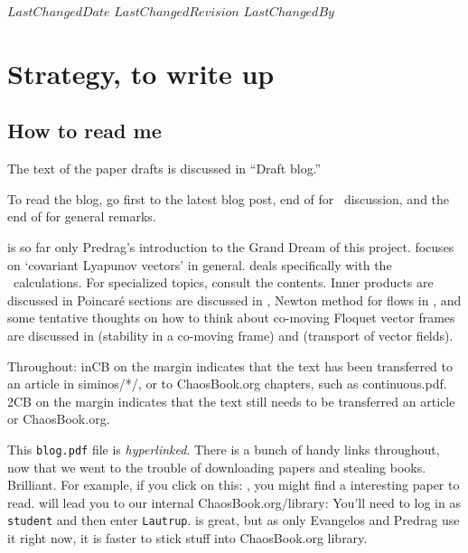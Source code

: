 \ifsvnmulti
 {$LastChangedDate$}
 {$LastChangedRevision$} {$LastChangedBy$}
\fi

\chapter{Strategy, to write up}

\section{How to read me}

The text of the paper drafts is discussed in 
``Draft blog.''

To read the blog, go first to the latest blog post, end
of  for \KS\ discussion, and the end
of  for general remarks.

 is so far only Predrag's introduction to the Grand
Dream of this project.  focuses on `covariant
Lyapunov vectors' in general.  deals specifically
with the \KS\ calculations.
For specialized topics, consult the contents. Inner products are
discussed in  Poincar\'e sections are discussed
in , Newton method for flows in
, and some tentative thoughts on how to think about
co-moving Floquet vector frames are discussed in
 (stability in a co-moving frame) and
 (transport of vector fields).

Throughout:  {\footnotesize inCB} on the margin                 \inCB
indicates that the text has been transferred to an
article in siminos/*/,  or to ChaosBook.org
chapters, such as
{continuous.pdf}.
 {\footnotesize 2CB} on the margin indicates that the text
still needs to be transferred an article or ChaosBook.org.      \toCB

This \texttt{blog.pdf} file is \emph{hyperlinked}. 
There is a bunch of handy links throughout, 
now that we went to the trouble of downloading papers and stealing books. Brilliant.
For example, if you click on
this: , you might find a interesting paper to read.
 will
lead you to our internal ChaosBook.org/library:
You'll need to log in as \texttt{student} and then enter \texttt{Lautrup}.
 is great, 
but as only Evangelos and Predrag use it right now, 
it is faster to stick stuff into ChaosBook.org library.


